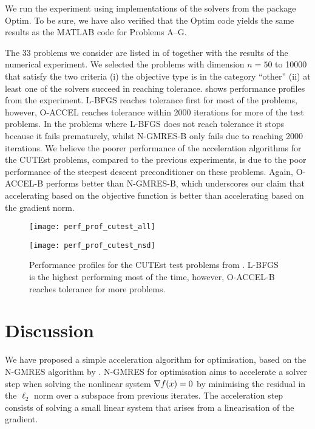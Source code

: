 \documentclass[main.tex]{subfiles}
\begin{document}
We run the experiment using implementations of the solvers from the
package Optim. To be sure, we have also verified
that the Optim code yields the same results as the MATLAB code for
Problems A--G.

The \num{33} problems we consider are listed in
 of  together
with the results of the numerical experiment.  We selected the
problems with dimension $n=50$ to \num{10000} that satisfy the two
criteria (i) the objective type is in the category ``other'' (ii) at
least one of the solvers succeed in reaching tolerance.
 shows performance profiles from the
experiment. L-BFGS reaches tolerance first for most of the problems,
however, O-ACCEL reaches tolerance within \num{2000} iterations for
more of the test problems. In the problems where L-BFGS does not reach
tolerance it stops because it fails prematurely, whilst N-GMRES-B only
fails due to reaching \num{2000} iterations.  We believe the poorer
performance of the acceleration algorithms for the CUTEst problems,
compared to the previous experiments, is due to the poor performance
of the steepest descent preconditioner on these problems.  Again,
O-ACCEL-B performs better than N-GMRES-B, which underscores our claim
that accelerating based on the objective function is better than
accelerating based on the gradient norm.
\begin{figure}[htb]
  \centering
  \begin{minipage}{0.499\textwidth}
    \texttt{[image: perf\_prof\_cutest\_all]}
  \end{minipage}%
  \begin{minipage}{0.499\textwidth}
    \texttt{[image: perf\_prof\_cutest\_nsd]}
  \end{minipage}
  \caption[Performance profiles for the CUTEst test problems]{Performance profiles for the CUTEst test problems from
    .  L-BFGS is the highest
    performing most of the time, however, O-ACCEL-B reaches tolerance
    for more problems.}\label{fig:perf_prof_cutest}
\end{figure}

\section{Discussion}\label{sec:accel_conclusion}
We have proposed a simple acceleration algorithm for optimisation,
based on the N-GMRES algorithm by
\citet{washio1997krylov,sterck2013steepest}.  N-GMRES for optimisation
aims to accelerate a solver step when solving the nonlinear system
$\nabla f(x)=0$ by minimising the residual in the $\ell_2$ norm over
a subspace from previous iterates.  The acceleration step consists of
solving a small linear system that arises from a linearisation of the
gradient.
\end{document}

